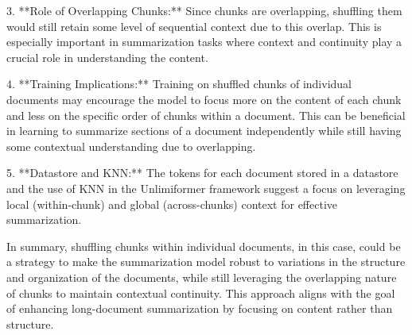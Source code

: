 \documentclass[12pt]{article}
\begin{document}
3. **Role of Overlapping Chunks:**
   Since chunks are overlapping, shuffling them would still retain some level of sequential context due to this overlap. This is especially important in summarization tasks where context and continuity play a crucial role in understanding the content.

4. **Training Implications:**
   Training on shuffled chunks of individual documents may encourage the model to focus more on the content of each chunk and less on the specific order of chunks within a document. This can be beneficial in learning to summarize sections of a document independently while still having some contextual understanding due to overlapping.

5. **Datastore and KNN:**
   The tokens for each document stored in a datastore and the use of KNN in the Unlimiformer framework suggest a focus on leveraging local (within-chunk) and global (across-chunks) context for effective summarization.

In summary, shuffling chunks within individual documents, in this case, could be a strategy to make the summarization model robust to variations in the structure and organization of the documents, while still leveraging the overlapping nature of chunks to maintain contextual continuity. This approach aligns with the goal of enhancing long-document summarization by focusing on content rather than structure.
\end{document}
